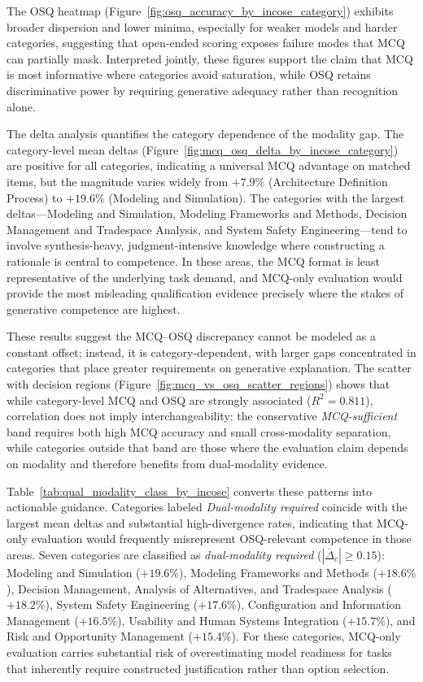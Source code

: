 The OSQ heatmap (Figure~\ref{fig:osq_accuracy_by_incose_category}) exhibits broader dispersion and lower minima, especially for weaker models and harder categories, suggesting that open-ended scoring exposes failure modes that MCQ can partially mask. Interpreted jointly, these figures support the claim that MCQ is most informative where categories avoid saturation, while OSQ retains discriminative power by requiring generative adequacy rather than recognition alone.

The delta analysis quantifies the category dependence of the modality gap. The category-level mean deltas (Figure~\ref{fig:mcq_osq_delta_by_incose_category}) are positive for all categories, indicating a universal MCQ advantage on matched items, but the magnitude varies widely from $+7.9\%$ (Architecture Definition Process) to $+19.6\%$ (Modeling and Simulation). The categories with the largest deltas---Modeling and Simulation, Modeling Frameworks and Methods, Decision Management and Tradespace Analysis, and System Safety Engineering---tend to involve synthesis-heavy, judgment-intensive knowledge where constructing a rationale is central to competence. In these areas, the MCQ format is least representative of the underlying task demand, and MCQ-only evaluation would provide the most misleading qualification evidence precisely where the stakes of generative competence are highest.


These results suggest the MCQ–OSQ discrepancy cannot be modeled as a constant offset; instead, it is category-dependent, with larger gaps concentrated in categories that place greater requirements on generative explanation.  The scatter with decision regions (Figure~\ref{fig:mcq_vs_osq_scatter_regions}) shows that while category-level MCQ and OSQ are strongly associated (\(R^2=0.811\)), correlation does not imply interchangeability: the conservative \emph{MCQ-sufficient} band requires both high MCQ accuracy and small cross-modality separation, while categories outside that band are those where the evaluation claim depends on modality and therefore benefits from dual-modality evidence.

Table~\ref{tab:qual_modality_class_by_incose} converts these patterns into actionable guidance. Categories labeled \emph{Dual-modality required} coincide with the largest mean deltas and substantial high-divergence rates, indicating that MCQ-only evaluation would frequently misrepresent OSQ-relevant competence in those areas. Seven categories are classified as \textit{dual-modality required} ($|\overline{\Delta}_c| \geq 0.15$): Modeling and Simulation ($+19.6\%$), Modeling Frameworks and Methods ($+18.6\%$), Decision Management, Analysis of Alternatives, and Tradespace Analysis ($+18.2\%$), System Safety Engineering ($+17.6\%$), Configuration and Information Management ($+16.5\%$), Usability and Human Systems Integration ($+15.7\%$), and Risk and Opportunity Management ($+15.4\%$). For these categories, MCQ-only evaluation carries substantial risk of overestimating model readiness for tasks that inherently require constructed justification rather than option selection. 

